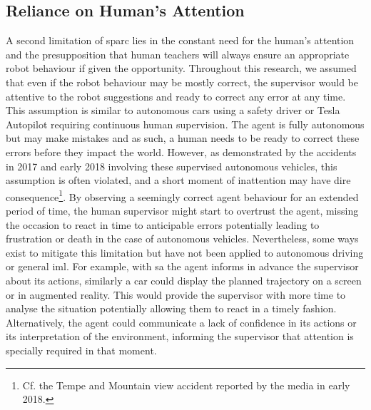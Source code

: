 \subsection{Reliance on Human's Attention}
A second limitation of \gls{sparc} lies in the constant need for the human's attention and the presupposition that human teachers will always ensure an appropriate robot behaviour if given the opportunity. Throughout this research, we assumed that even if the robot behaviour may be mostly correct, the supervisor would be attentive to the robot suggestions and ready to correct any error at any time. This assumption is similar to autonomous cars using a safety driver or Tesla Autopilot requiring continuous human supervision. The agent is fully autonomous but may make mistakes and as such, a human needs to be ready to correct these errors before they impact the world. However, as demonstrated by the accidents in 2017 and early 2018 involving these supervised autonomous vehicles, this assumption is often violated, and a short moment of inattention may have dire consequence\footnote{Cf. the Tempe and Mountain view accident reported by the media in early 2018.\label{foot:disc_danger}}. By observing a seemingly correct agent behaviour for an extended period of time, the human supervisor might start to overtrust the agent, missing the occasion to react in time to anticipable errors potentially leading to frustration or death in the case of autonomous vehicles. Nevertheless, some ways exist to mitigate this limitation but have not been applied to autonomous driving or general \gls{iml}. For example, with \gls{sa} the agent informs in advance the supervisor about its actions, similarly a car could display the planned trajectory on a screen or in augmented reality. This would provide the supervisor with more time to analyse the situation potentially allowing them to react in a timely fashion. Alternatively, the agent could communicate a lack of confidence in its actions or its interpretation of the environment, informing the supervisor that attention is specially required in that moment.

